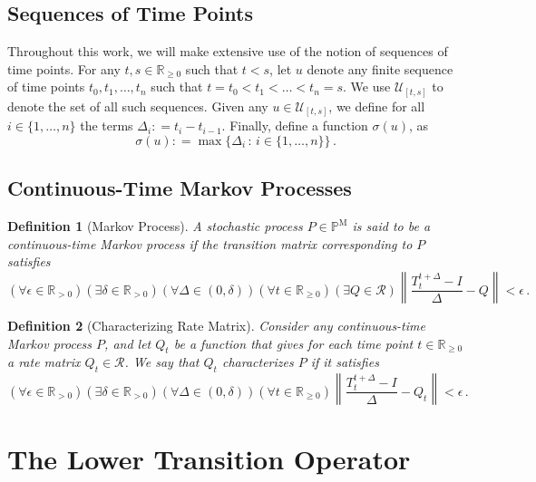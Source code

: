\documentclass[10pt]{paper}
\newtheorem{definition}{Definition}
\newcommand{\reals}{\mathbb{R}}
\newcommand{\realspos}{\reals_{>0}}
\newcommand{\realsnonneg}{\reals_{\geq 0}}
\newcommand{\processes}{\mathbb{P}}
\newcommand{\mprocesses}{\processes^{\mathrm{M}}}
\newcommand{\norm}[1]{\left\lVert #1 \right\rVert}
\newcommand{\coloneqq}{:\!=}
\begin{document}
\subsection{Sequences of Time Points}

Throughout this work, we will make extensive use of the notion of sequences of time points. For any $t,s\in\realsnonneg$ such that $t<s$, let $u$ denote any finite sequence of time points $t_0,t_1,\ldots,t_n$ such that $t=t_0 < t_1 <\ldots < t_n = s$. We use $\mathcal{U}_{[t,s]}$ to denote the set of all such sequences. Given any $u\in\mathcal{U}_{[t,s]}$, we define for all $i\in\{1,\ldots,n\}$ the terms $\Delta_i\coloneqq t_i-t_{i-1}$.  Finally, define a function $\sigma(u)$, as
\begin{equation*}
\sigma(u) \coloneqq \max\bigl\{\Delta_i\,:\,i\in\{1,\ldots,n\}\bigr\}\,.
\end{equation*}

\subsection{Continuous-Time Markov Processes}

\begin{definition}[Markov Process]\label{def:markov_process}
A stochastic process $P\in\mprocesses$ is said to be a \emph{continuous-time Markov process} if the transition matrix corresponding to $P$ satisfies
\begin{equation*}
(\forall \epsilon\in\realspos)(\exists \delta\in\realspos)(\forall \Delta\in(0,\delta))(\forall t\in\realsnonneg)(\exists Q\in\mathcal{R}) \norm{\frac{T_t^{t+\Delta} - I}{\Delta} - Q} < \epsilon\,.
\end{equation*}
\end{definition}

\begin{definition}[Characterizing Rate Matrix]\label{def:markov_process_char_matrix}
Consider any continuous-time Markov process $P$, and let $Q_t$ be a function that gives for each time point $t\in\realsnonneg$ a rate matrix $Q_t\in\mathcal{R}$. We say that $Q_t$ \emph{characterizes} $P$ if it satisfies
\begin{equation*}
(\forall \epsilon\in\realspos)(\exists \delta\in\realspos)(\forall \Delta\in(0,\delta))(\forall t\in\realsnonneg)\norm{\frac{T_t^{t+\Delta} - I}{\Delta} - Q_t} < \epsilon\,.
\end{equation*}
\end{definition}

\section{The Lower Transition Operator}\label{sec:lower_operator}
\end{document}
